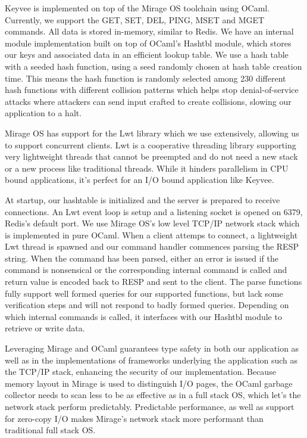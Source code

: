 \documentclass[english,10pt,twocolumn]{article}
\begin{document}
Keyvee is implemented on top of the Mirage OS toolchain using OCaml.
Currently, we support the GET, SET, DEL, PING, MSET and MGET commands.
All data is stored in-memory, similar to Redis.
We have an internal module implementation built on top of OCaml's Hashtbl module, which stores our keys and associated data in an efficient lookup table.
We use a hash table with a seeded hash function, using a seed randomly chosen at hash table creation time.
This means the hash function is randomly selected among 230 different hash functions with different collision patterns which helps stop denial-of-service attacks where attackers can send input crafted to create collisions, slowing our application to a halt.

Mirage OS has support for the Lwt library which we use extensively, allowing us to support concurrent clients.
Lwt is a cooperative threading library supporting very lightweight threads that cannot be preempted and do not need a new stack or a new process like traditional threads.
While it hinders parallelism in CPU bound applications, it's perfect for an I/O bound application like Keyvee.

At startup, our hashtable is initialized and the server is prepared to receive connections. An Lwt event loop is setup and a listening socket is opened on 6379, Redis's default port.
We use Mirage OS's low level TCP/IP network stack which is implemented in pure OCaml.
When a client attemps to connect, a lightweight Lwt thread is spawned and our command handler commences parsing the RESP string.
When the command has been parsed, either an error is issued if the command is nonsensical or the corresponding internal command is called and return value is encoded back to RESP and sent to the client.
The parse functions fully support well formed queries for our supported functions, but lack some verification steps and will not respond to badly formed queries.
Depending on which internal commands is called, it interfaces with our Hashtbl module to retrieve or write data.

Leveraging Mirage and OCaml guarantees type safety in both our application as well as in the implementations of frameworks underlying the application such as the TCP/IP stack, enhancing the security of our implementation.
Because memory layout in Mirage is used to distinguish I/O pages, the OCaml garbage collector needs to scan less to be as effective as in a full stack OS, which let's the network stack perform predictably.
Predictable performance, as well as support for zero-copy I/O makes Mirage's network stack more performant than traditional full stack OS.
\end{document}
